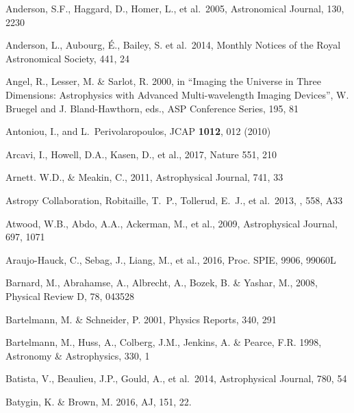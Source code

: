 \documentclass[twocolumn]{aastex61}
\begin{document}
\begin{thebibliography}{}
 Anderson, S.F., Haggard, D., Homer, L., et al.~2005, Astronomical Journal, 130, 2230

 Anderson, L., Aubourg, \'E., Bailey, S. et al.~2014, Monthly Notices of the Royal Astronomical Society, 441, 24

 Angel, R., Lesser, M. \& Sarlot, R. 2000, in  ``Imaging the Universe in Three Dimensions: Astrophysics with Advanced Multi-wavelength Imaging Devices'', W. Bruegel and J. Bland-Hawthorn, eds., ASP Conference Series, 195, 81

 Antoniou, I., and L.~Perivolaropoulos, JCAP {\bf 1012}, 012 (2010)

 Arcavi, I., Howell, D.A., Kasen, D., et al., 2017, Nature 551, 210

 Arnett. W.D., \& Meakin, C., 2011, Astrophysical Journal, 741, 33

 Astropy Collaboration, Robitaille, T.~P., Tollerud, E.~J., et al.\ 2013, \aap, 558, A33

 Atwood, W.B., Abdo, A.A., Ackerman, M., et al., 2009, Astrophysical Journal, 697, 1071

 Araujo-Hauck, C., Sebag, J., Liang, M., et al., 2016,  Proc. SPIE, 9906, 99060L

 Barnard, M., Abrahamse, A., Albrecht, A., Bozek, B. \& Yashar, M., 2008, Physical Review D, 78, 043528

 Bartelmann, M. \& Schneider, P. 2001, Physics Reports, 340, 291

 Bartelmann, M., Huss, A., Colberg, J.M., Jenkins, A. \& Pearce, F.R. 1998, Astronomy \& Astrophysics, 330, 1

 Batista, V., Beaulieu, J.P., Gould, A., et al.~2014, Astrophysical Journal, 780, 54

 Batygin, K. \& Brown, M. 2016, AJ, 151, 22.


\end{thebibliography}
\end{document}
